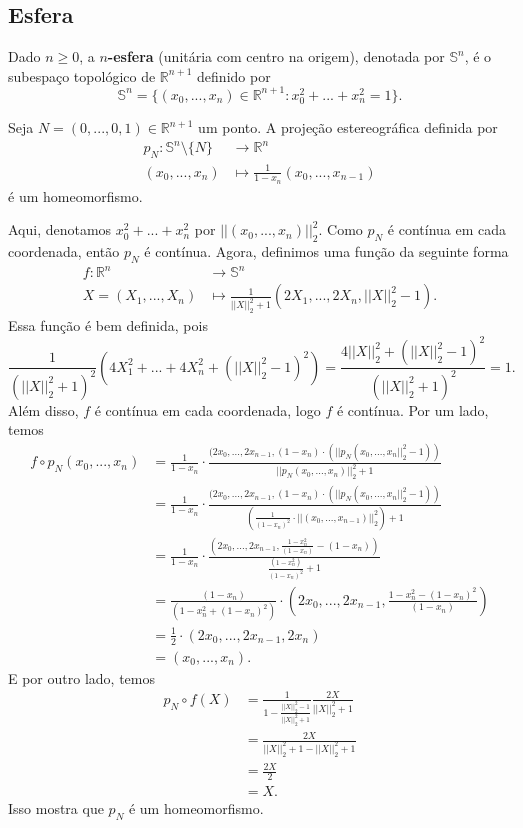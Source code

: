 \subsection{Esfera}
\label{esfera-def}

\begin{defi}
     Dado $n\geq 0$, a \textbf{$n$-esfera} (unitária com centro na origem), denotada por $\mathbb{S}^n$, é o subespaço topológico de $\mathbb{R}^{n+1}$ definido por 
     \[\mathbb{S}^n=\{(x_0,...,x_n)\in \mathbb{R}^{n+1}:x_0^2+...+x_n^2=1\}.\]
\end{defi}

\begin{prop}
    Seja $N=(0,...,0,1)\in \mathbb{R}^{n+1}$ um ponto. A projeção estereográfica definida por 
    \begin{align*}
        p_N:\mathbb{S}^n\setminus \{N\}&\longrightarrow \mathbb{R}^n\\
        (x_0,...,x_n)&\longmapsto \frac{1}{1-x_n}(x_0,...,x_{n-1})
    \end{align*}
    é um homeomorfismo.
\end{prop}
\begin{dem}
    Aqui, denotamos $x_0^2+...+x_n^2$ por $||(x_0,...,x_n)||_2^2$. Como $p_N$ é contínua em cada coordenada, então $p_N$ é contínua. Agora, definimos uma função da seguinte forma 
    \begin{align*}
        f:\mathbb{R}^n&\longrightarrow \mathbb{S}^n\\
        X=(X_1,...,X_n)&\longmapsto \frac{1}{||X||_2^2+1}(2X_1,...,2X_{n},||X||_2^2-1).
    \end{align*}
    Essa função é bem definida, pois 
    \[\frac{1}{(||X||_2^2+1)^2}(4X_1^2+...+4X_n^2+(||X||_2^2-1)^2)=\frac{4||X||_2^2+(||X||_2^2-1)^2}{(||X||_2^2+1)^2}=1.\]
    Além disso, $f$ é contínua em cada coordenada, logo $f$ é contínua. Por um lado, temos 
    \begin{align*}
        f\circ p_N(x_0,...,x_n)&=\frac{1}{1-x_n}\cdot \frac{(2x_0,...,2x_{n-1},(1-x_n)\cdot(||p_N(x_0,...,x_{n}||_2^2-1))}{||p_N(x_0,...,x_n)||_2^2+1}\\
        &=\frac{1}{1-x_n}\cdot\frac{(2x_0,...,2x_{n-1},(1-x_n)\cdot(||p_N(x_0,...,x_{n}||_2^2-1))}{(\frac{1}{(1-x_n)^2}\cdot ||(x_0,...,x_{n-1})||_2^2)+1}\\
        &=\frac{1}{1-x_n}\cdot\frac{(2x_0,...,2x_{n-1},\frac{1-x_n^2}{(1-x_n)}-(1-x_n))}{\frac{(1-x_n^2)}{(1-x_n)^2}+1}\\
        &=\frac{(1-x_n)}{(1-x_n^2+(1-x_n)^2)}\cdot(2x_0,...,2x_{n-1},\frac{1-x_n^2-(1-x_n)^2}{(1-x_n)})\\
        &=\frac{1}{2}\cdot(2x_0,...,2x_{n-1},2x_n)\\
        &=(x_0,...,x_n).
    \end{align*}
    E por outro lado, temos 
    \begin{align*}
        p_N\circ f(X)&=\frac{1}{1-\frac{||X||_2^2-1}{||X||_2^2+1}}\frac{2X}{||X||_2^2+1}\\
        &=\frac{2X}{||X||_2^2+1-||X||_2^2+1}\\
        &=\frac{2X}{2}\\
        &=X.
    \end{align*}
    Isso mostra que $p_N$ é um homeomorfismo.
\end{dem}
